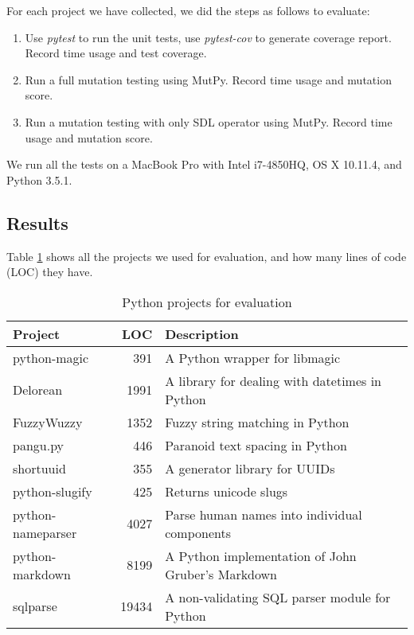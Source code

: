 \documentclass[12pt]{article}
\begin{document}
For each project we have collected, we did the steps as follows to evaluate:

\begin{enumerate}
  \item Use \emph{pytest} \cite{pytest} to run the unit tests, use \emph{pytest-cov} \cite{pytest-cov} to generate coverage report. Record time usage and test coverage.
  \item Run a full mutation testing using MutPy. Record time usage and mutation score.
  \item Run a mutation testing with only SDL operator using MutPy. Record time usage and mutation score.
\end{enumerate}

We run all the tests on a MacBook Pro with Intel i7-4850HQ, OS X 10.11.4, and Python 3.5.1.

\subsection{Results}

Table \ref{table:projects} shows all the projects we used for evaluation, and how many lines of code (LOC) they have.

\begin{table}[H]
\begin{center}
\caption{Python projects for evaluation}
\label{table:projects}
\begin{tabular}{|l|r|l|}
\hline
{\bf Project} & {\bf LOC} & {\bf Description} \\
\hline
python-magic      & 391   & A Python wrapper for libmagic \\
Delorean          & 1991  & A library for dealing with datetimes in Python \\
FuzzyWuzzy        & 1352  & Fuzzy string matching in Python \\
pangu.py          & 446   & Paranoid text spacing in Python \\
shortuuid         & 355   & A generator library for UUIDs \\
python-slugify    & 425   & Returns unicode slugs \\
python-nameparser & 4027  & Parse human names into individual components \\
python-markdown   & 8199  & A Python implementation of John Gruber’s Markdown \\
sqlparse          & 19434 & A non-validating SQL parser module for Python \\
\hline
\end{tabular}
\end{center}
\end{table}
\end{document}
